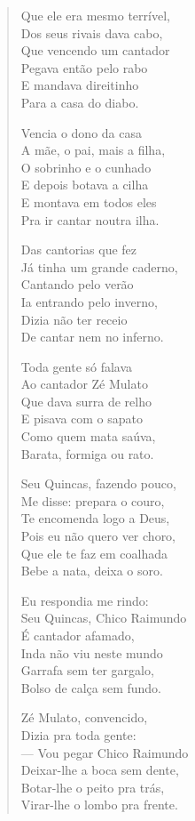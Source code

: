 \begin{verse}
Que ele era mesmo terrível,\\
Dos seus rivais dava cabo,\\
Que vencendo um cantador\\
Pegava então pelo rabo\\
E mandava direitinho\\
Para a casa do diabo.

Vencia o dono da casa\\
A mãe, o pai, mais a filha,\\
O sobrinho e o cunhado\\
E depois botava a cilha\\
E montava em todos eles\\
Pra ir cantar noutra ilha.


Das cantorias que fez\\
Já tinha um grande caderno,\\
Cantando pelo verão\\
Ia entrando pelo inverno,\\
Dizia não ter receio\\
De cantar nem no inferno.

Toda gente só falava\\
Ao cantador Zé Mulato\\
Que dava surra de relho\\
E pisava com o sapato\\
Como quem mata saúva,\\
Barata, formiga ou rato.

Seu Quincas, fazendo pouco,\\
Me disse: prepara o couro,\\
Te encomenda logo a Deus,\\
Pois eu não quero ver choro,\\
Que ele te faz em coalhada\\
Bebe a nata, deixa o soro.

Eu respondia me rindo:\\
Seu Quincas, Chico Raimundo\\
É cantador afamado,\\
Inda não viu neste mundo\\
Garrafa sem ter gargalo,\\
Bolso de calça sem fundo.


Zé Mulato, convencido,\\
Dizia pra toda gente: \\
— Vou pegar Chico Raimundo\\
Deixar-lhe a boca sem dente,\\
Botar-lhe o peito pra trás,\\
Virar-lhe o lombo pra frente.


\end{verse}
